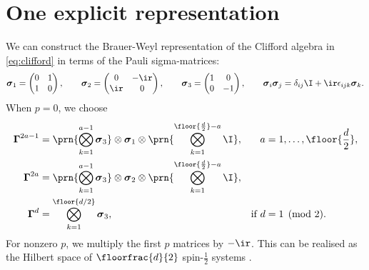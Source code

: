 \documentclass[11pt]{article}
\newcommand{\Gammab}{\boldsymbol{\Gamma}}
\newcommand{\sigmab}{\boldsymbol{\sigma}}
\begin{document}

\section{One explicit representation}\label{sec:explicit}

We can construct the Brauer-Weyl representation \cite{brauer1935spinors} of the Clifford algebra in \cref{eq:clifford} in terms of the Pauli sigma-matrices:
%
\begin{equation}\label{eq:paulisigma}
  \sigmab_1 = \begin{pmatrix}
                0 & 1 \\
                1 & 0 \\
              \end{pmatrix}
  , \qquad
  \sigmab_2 = \begin{pmatrix}
                0   & -\ir \\
                \ir & 0    \\
              \end{pmatrix}
  , \qquad
  \sigmab_3 = \begin{pmatrix}
                1 & 0  \\
                0 & -1 \\
              \end{pmatrix}
  , \qquad
  \sigmab_i \sigmab_j = \delta_{ij} \I + \ir \epsilon_{ijk} \sigmab_k.
\end{equation}
%
When $p=0$, we choose
%
\begin{equation}\label{eq:explicit}
\begin{aligned}
  \Gammab^{2a-1} &= \prn{\bigotimes_{k=1}^{a-1} \sigmab_3}
                    \otimes \sigmab_1 \otimes
                    \prn{\bigotimes_{k=1}^{\floor{\frac{d}{2}}-a} \I}, &
    a &= 1, \ldots, \floor{\frac{d}{2}}, \\
  \Gammab^{2a} &= \prn{\bigotimes_{k=1}^{a-1} \sigmab_3}
                  \otimes \sigmab_2 \otimes
                  \prn{\bigotimes_{k=1}^{\floor{\frac{d}{2}}-a} \I}, \\
  \Gammab^d &= \bigotimes_{k=1}^{\floor{d/2}} \sigmab_3, &
    \text{if }
    d &= 1 \pmod 2.
\end{aligned}
\end{equation}
%
For nonzero $p$, we multiply the first $p$ matrices by $-\ir$.
This can be realised as the Hilbert space of $\floorfrac{d}{2}$ spin-$\frac{1}{2}$ systems
\cite{Strathdee:1987jr,strathdee1986extended}.
\end{document}
